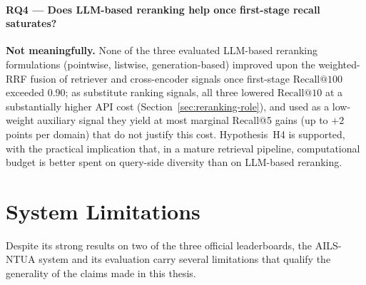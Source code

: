 \paragraph{RQ4 --- Does LLM-based reranking help once first-stage recall saturates?}
\textbf{Not meaningfully.} None of the three evaluated LLM-based reranking formulations (pointwise, listwise, generation-based) improved upon the weighted-RRF fusion of retriever and cross-encoder signals once first-stage $\text{Recall@100}$ exceeded $0.90$; as substitute ranking signals, all three lowered $\text{Recall@10}$ at a substantially higher API cost (Section~\ref{sec:reranking-role}), and used as a low-weight auxiliary signal they yield at most marginal Recall@5 gains (up to $+2$ points per domain) that do not justify this cost. Hypothesis~H4 is supported, with the practical implication that, in a mature retrieval pipeline, computational budget is better spent on query-side diversity than on LLM-based reranking.

\section{System Limitations}
\label{sec:limitations}

Despite its strong results on two of the three official leaderboards, the AILS-NTUA system and its evaluation carry several limitations that qualify the generality of the claims made in this thesis.


